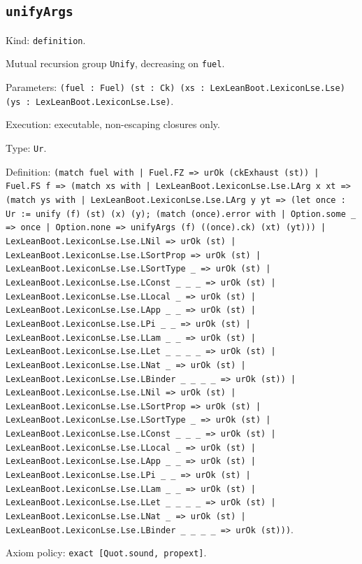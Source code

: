 \documentclass[11pt]{article}
\begin{document}
\subsection*{\texttt{unifyArgs}}
\noindent Kind: \texttt{definition}.\par
\noindent Mutual recursion group \texttt{Unify}, decreasing on \texttt{fuel}.\par
\noindent Parameters: \texttt{(fuel : Fuel) (st : Ck) (xs : LexLeanBoot.LexiconLse.Lse) (ys : LexLeanBoot.LexiconLse.Lse)}.\par
\noindent Execution: executable, non-escaping closures only.\par
\noindent Type: \texttt{Ur}.\par
\noindent Definition: \texttt{(match fuel with | Fuel.FZ => urOk (ckExhaust (st)) | Fuel.FS f => (match xs with | LexLeanBoot.LexiconLse.Lse.LArg x xt => (match ys with | LexLeanBoot.LexiconLse.Lse.LArg y yt => (let once : Ur := unify (f) (st) (x) (y); (match (once).error with | Option.some \_ => once | Option.none => unifyArgs (f) ((once).ck) (xt) (yt))) | LexLeanBoot.LexiconLse.Lse.LNil => urOk (st) | LexLeanBoot.LexiconLse.Lse.LSortProp => urOk (st) | LexLeanBoot.LexiconLse.Lse.LSortType \_ => urOk (st) | LexLeanBoot.LexiconLse.Lse.LConst \_ \_ \_ => urOk (st) | LexLeanBoot.LexiconLse.Lse.LLocal \_ => urOk (st) | LexLeanBoot.LexiconLse.Lse.LApp \_ \_ => urOk (st) | LexLeanBoot.LexiconLse.Lse.LPi \_ \_ => urOk (st) | LexLeanBoot.LexiconLse.Lse.LLam \_ \_ => urOk (st) | LexLeanBoot.LexiconLse.Lse.LLet \_ \_ \_ \_ => urOk (st) | LexLeanBoot.LexiconLse.Lse.LNat \_ => urOk (st) | LexLeanBoot.LexiconLse.Lse.LBinder \_ \_ \_ \_ => urOk (st)) | LexLeanBoot.LexiconLse.Lse.LNil => urOk (st) | LexLeanBoot.LexiconLse.Lse.LSortProp => urOk (st) | LexLeanBoot.LexiconLse.Lse.LSortType \_ => urOk (st) | LexLeanBoot.LexiconLse.Lse.LConst \_ \_ \_ => urOk (st) | LexLeanBoot.LexiconLse.Lse.LLocal \_ => urOk (st) | LexLeanBoot.LexiconLse.Lse.LApp \_ \_ => urOk (st) | LexLeanBoot.LexiconLse.Lse.LPi \_ \_ => urOk (st) | LexLeanBoot.LexiconLse.Lse.LLam \_ \_ => urOk (st) | LexLeanBoot.LexiconLse.Lse.LLet \_ \_ \_ \_ => urOk (st) | LexLeanBoot.LexiconLse.Lse.LNat \_ => urOk (st) | LexLeanBoot.LexiconLse.Lse.LBinder \_ \_ \_ \_ => urOk (st)))}.\par
\noindent Axiom policy: \texttt{exact [Quot.sound, propext]}.\par
\end{document}
